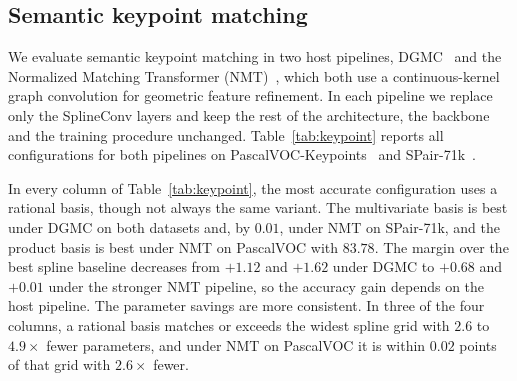\documentclass{article} %
\begin{document}
\subsection{Semantic keypoint matching}
\label{sec:pascalvoc}
We evaluate semantic keypoint matching in two host pipelines,
DGMC~\citep{fey2020dgmc} and the Normalized Matching Transformer
(NMT)~\citep{normmatchtrans}, which both use a continuous-kernel graph
convolution for geometric feature refinement. In each pipeline we replace only
the SplineConv layers and keep the rest of the architecture, the backbone and
the training procedure unchanged. Table~\ref{tab:keypoint} reports all
configurations for both pipelines on
PascalVOC-Keypoints~\citep{everingham2010pascal,bourdev2009poselets} and
SPair-71k~\citep{min2019spair}.

In every column of Table~\ref{tab:keypoint}, the most accurate configuration
uses a rational basis, though not always the same variant. The multivariate
basis is best under DGMC on both datasets and, by $0.01$, under NMT on
SPair-71k, and the product basis is best under NMT on PascalVOC with $83.78$. The margin over the best spline baseline decreases
from $+1.12$ and $+1.62$ under DGMC to $+0.68$ and $+0.01$ under the stronger
NMT pipeline, so the accuracy gain depends on the host pipeline. The parameter
savings are more consistent. In three of the four columns, a rational basis
matches or exceeds the widest spline grid with $2.6$ to $4.9\times$ fewer
parameters, and under NMT on PascalVOC it is within $0.02$ points of that grid
with $2.6\times$ fewer.
\end{document}
